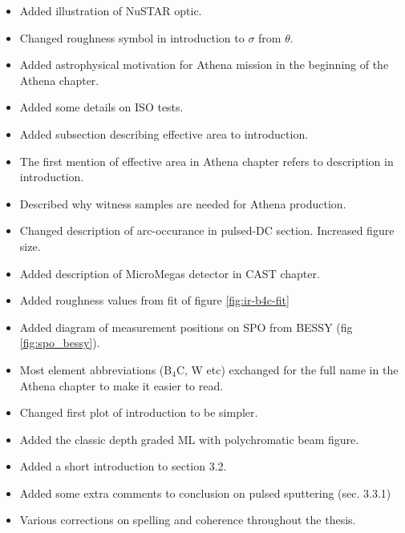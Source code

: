 \begin{itemize}
  \item Added illustration of NuSTAR optic.
  \item Changed roughness symbol in introduction to $\sigma$ from $\theta$.
  \item Added astrophysical motivation for Athena mission in the beginning of the Athena chapter.
  \item Added some details on ISO tests.
  \item Added subsection describing effective area to introduction.
  \item The first mention of effective area in Athena chapter refers to description in introduction.
  \item Described why witness samples are needed for Athena production.
  \item Changed description of arc-occurance in pulsed-DC section. Increased figure size.
  \item Added description of MicroMegas detector in CAST chapter.
  \item Added roughness values from fit of figure \ref{fig:ir-b4c-fit}
  \item Added diagram of measurement positions on SPO from BESSY (fig \ref{fig:spo_bessy}).
  \item Most element abbreviations (B$_4$C, W etc) exchanged for the full name in the Athena chapter to make it easier to read.
  \item Changed first plot of introduction to be simpler.
  \item Added the classic depth graded ML with polychromatic beam figure.
  \item Added a short introduction to section 3.2.
  \item Added some extra comments to conclusion on pulsed sputtering (sec. 3.3.1)

  \item Various corrections on spelling and coherence throughout the thesis.
\end{itemize}

